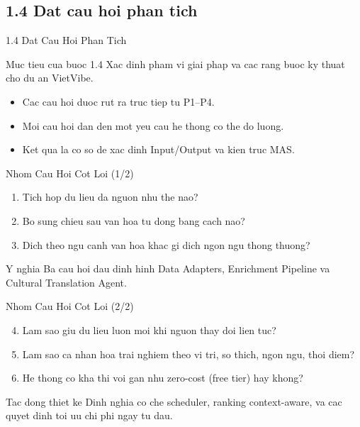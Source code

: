 \subsection{1.4 Dat cau hoi phan tich}

\begin{frame}[t]{1.4 Dat Cau Hoi Phan Tich}
\begin{block}{Muc tieu cua buoc 1.4}
Xac dinh pham vi giai phap va cac rang buoc ky thuat cho du an VietVibe.
\end{block}

\begin{itemize}
    \item Cac cau hoi duoc rut ra truc tiep tu P1--P4.
    \item Moi cau hoi dan den mot yeu cau he thong co the do luong.
    \item Ket qua la co so de xac dinh Input/Output va kien truc MAS.
\end{itemize}
\end{frame}

\begin{frame}[t]{Nhom Cau Hoi Cot Loi (1/2)}
\begin{enumerate}
    \item Tich hop du lieu da nguon nhu the nao?
    \item Bo sung chieu sau van hoa tu dong bang cach nao?
    \item Dich theo ngu canh van hoa khac gi dich ngon ngu thong thuong?
\end{enumerate}

\vspace{0.4cm}
\begin{alertblock}{Y nghia}
Ba cau hoi dau dinh hinh Data Adapters, Enrichment Pipeline va Cultural Translation Agent.
\end{alertblock}
\end{frame}

\begin{frame}[t]{Nhom Cau Hoi Cot Loi (2/2)}
\begin{enumerate}
    \setcounter{enumi}{3}
    \item Lam sao giu du lieu luon moi khi nguon thay doi lien tuc?
    \item Lam sao ca nhan hoa trai nghiem theo vi tri, so thich, ngon ngu, thoi diem?
    \item He thong co kha thi voi gan nhu zero-cost (free tier) hay khong?
\end{enumerate}

\vspace{0.4cm}
\begin{block}{Tac dong thiet ke}
Dinh nghia co che scheduler, ranking context-aware, va cac quyet dinh toi uu chi phi ngay tu dau.
\end{block}
\end{frame}
